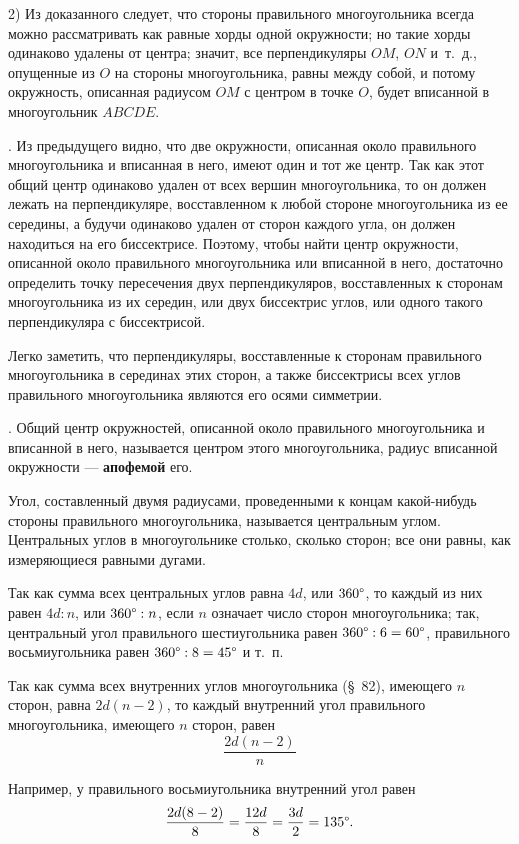 \documentclass[oneside]{book}
\begin{document}
2) Из доказанного следует, что стороны правильного многоугольника всегда можно рассматривать как равные хорды одной окружности;
но такие хорды одинаково удалены от центра;
значит, все перпендикуляры $OM$, $ON$ и~т.~д., опущенные из $O$ на стороны многоугольника, равны между собой, и потому окружность, описанная радиусом $OM$ с центром в точке $O$, будет вписанной в многоугольник $ABCDE$.

.
Из предыдущего видно, что две окружности, описанная около правильного многоугольника и вписанная в него, имеют один и тот же центр.
Так как этот общий центр одинаково удален от всех вершин многоугольника, то он должен лежать на перпендикуляре, восставленном к любой стороне многоугольника из ее середины, а будучи одинаково удален от сторон каждого угла, он должен находиться на его биссектрисе.
Поэтому, чтобы найти центр окружности, описанной около правильного многоугольника или вписанной в него, достаточно определить точку пересечения двух перпендикуляров, восставленных к сторонам многоугольника из их середин, или двух биссектрис углов, или одного такого перпендикуляра с биссектрисой.

Легко заметить, что перпендикуляры, восставленные к сторонам правильного многоугольника в серединах этих сторон, а также биссектрисы всех углов правильного многоугольника являются его осями симметрии.

.
Общий центр окружностей, описанной около правильного многоугольника и вписанной в него, называется центром этого многоугольника, радиус вписанной окружности — \textbf{апофемой} его.

Угол, составленный двумя радиусами, проведенными к концам какой-нибудь стороны правильного многоугольника, называется центральным углом.
Центральных углов в многоугольнике столько, сколько сторон;
все они равны, как измеряющиеся равными дугами.

Так как сумма всех центральных углов равна $4d$, или $360\degree$, то каждый из них равен $4d:n$, или $360\degree:n$, если $n$ означает число сторон многоугольника;
так, центральный угол правильного шестиугольника равен $360\degree:6=60\degree$, правильного восьмиугольника равен $360\degree:8 = 45\degree$ и т.~п.

Так как сумма всех внутренних углов многоугольника (§~82), имеющего $n$ сторон, равна $2d(n-2)$, то каждый внутренний угол правильного многоугольника, имеющего $n$ сторон, равен
\[\frac{2d(n-2)}{n}\]

Например, у правильного восьмиугольника внутренний угол равен
\[\frac{2d(8-2)}{8}=\frac{12d}{8}=\frac{3d}{2}=135\degree.\]
\end{document}
